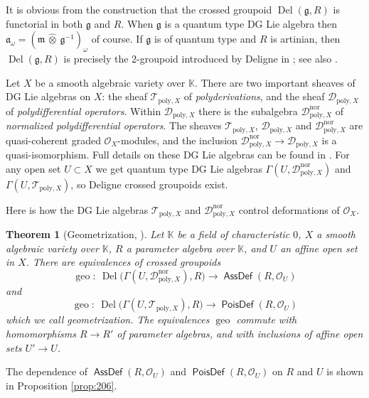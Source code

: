 \documentclass[a4paper, 10pt]{amsart}
\newtheorem{thm}[equation]{Theorem}
\theoremstyle{definition}
\numberwithin{equation}{section}
\newcommand{\opn}{\operatorname}
\newcommand{\cat}[1]{\operatorname{\mathsf{#1}}}
\newcommand{\mfrak}[1]{\mathfrak{#1}}
\newcommand{\mcal}[1]{\mathcal{#1}}
\newcommand{\mrm}[1]{\mathrm{#1}}
\newcommand{\mbb}[1]{\mathbb{#1}}
\newcommand{\hatotimes}[1]{\, \what{{\otimes}}_{#1} \,}
\newcommand{\hot}{\hatotimes{}}
\newcommand{\what}[1]{\widehat{#1}}
\newcommand{\K}{\mbb{K}}
\newcommand{\g}{\mfrak{g}}
\newcommand{\m}{\mfrak{m}}
\renewcommand{\a}{\mfrak{a}}
\newcommand{\om}{\omega}
\newcommand{\OX}{\mcal{O}_X}
\begin{document}
It is obvious from the construction that the crossed groupoid
 $\opn{Del}(\g, R)$ is functorial in both $\g$ and $R$. 
When $\g$ is a quantum type DG Lie algebra then 
$\a_{\om} = (\m \hot \g^{-1})_{\om}$ of course.
If $\g$ is of quantum type and $R$ is artinian, then $\opn{Del}(\g, R)$
is precisely the $2$-groupoid introduced by Deligne in \cite{De}; see also 
\cite{Ge1}.

Let $X$ be a smooth algebraic variety over $\K$. 
There are two important sheaves of DG Lie algebras on $X$: the sheaf
$\mcal{T}_{\mrm{poly}, X}$ of {\em polyderivations}, and the
sheaf $\mcal{D}_{\mrm{poly}, X}$ of {\em polydifferential operators}. 
Within $\mcal{D}_{\mrm{poly}, X}$ there is the subalgebra
$\mcal{D}_{\mrm{poly}, X}^{\mrm{nor}}$ 
of {\em normalized polydifferential operators}. 
The sheaves $\mcal{T}_{\mrm{poly}, X}$, $\mcal{D}_{\mrm{poly}, X}$ and
$\mcal{D}_{\mrm{poly}, X}^{\mrm{nor}}$
are quasi-coherent graded $\OX$-modules, and the inclusion 
$\mcal{D}_{\mrm{poly}, X}^{\mrm{nor}} \to \mcal{D}_{\mrm{poly}, X}$
is a quasi-isomorphism. 
Full details on these DG Lie algebras can be found in \cite{Ye1, Ye2}. 
For any open set $U \subset X$ we get quantum type DG Lie algebras
$\Gamma(U, \mcal{D}_{\mrm{poly}, X}^{\mrm{nor}})$
and 
$\Gamma(U, \mcal{T}_{\mrm{poly}, X})$,
so Deligne crossed groupoids exist. 

Here is how the DG Lie algebras $\mcal{T}_{\mrm{poly}, X}$ and 
$\mcal{D}_{\mrm{poly}, X}^{\mrm{nor}}$ control deformations of 
$\OX$. 

\begin{thm}[{Geometrization, \cite[Theorem 0.1]{Ye9}}] \label{thm:205}
Let $\K$ be a field of characteristic $0$, $X$ a smooth algebraic variety
over $\K$, $R$ a parameter algebra over $\K$, 
and $U$ an affine open set in $X$.
There are equivalences of crossed groupoids
\[  \opn{geo} : \
\opn{Del} \bigl( \Gamma(U, \mcal{D}_{\mrm{poly}, X}^{\mrm{nor}}) , R \big)
\to \cat{AssDef}(R, \mcal{O}_U) \]
and
\[  \opn{geo} : \
\opn{Del} \bigl( \Gamma(U, \mcal{T}_{\mrm{poly}, X}) , R \big)
\to \cat{PoisDef}(R, \mcal{O}_U) \]
which we call {\em geometrization}. The equivalences $\opn{geo}$ 
commute with homomorphisms $R \to R'$ of parameter algebras, and with inclusions
of affine open sets $U' \to U$.
\end{thm}

The dependence of $\cat{AssDef}(R, \mcal{O}_U)$ and 
$\cat{PoisDef}(R, \mcal{O}_U)$ on $R$ and $U$ is shown in Proposition
\ref{prop:206}.  
\end{document}
